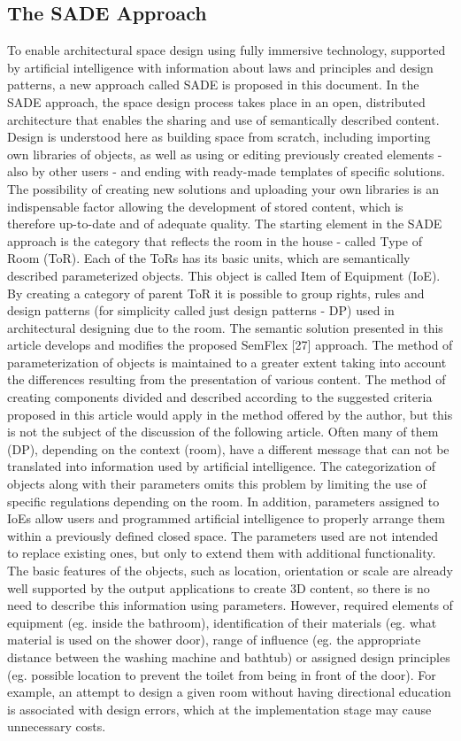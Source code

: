 \documentclass[runningheads]{llncs}
\begin{document}
\subsection{The SADE Approach}
To enable architectural space design using fully immersive technology, supported by artificial intelligence with information about laws and principles and design patterns, a new approach called SADE is proposed in this document.
In the SADE approach, the space design process takes place in an open, distributed architecture that enables the sharing and use of semantically described content. Design is understood here as building space from scratch, including importing own libraries of objects, as well as using or editing previously created elements - also by other users - and ending with ready-made templates of specific solutions. The possibility of creating new solutions and uploading your own libraries is an indispensable factor allowing the development of stored content, which is therefore up-to-date and of adequate quality.
The starting element in the SADE approach is the category that reflects the room in the house - called Type of Room (ToR). Each of the ToRs has its basic units, which are semantically described parameterized objects. This object is called Item of Equipment (IoE).
By creating a category of parent ToR it is possible to group rights, rules and design patterns (for simplicity called just design patterns - DP) used in architectural designing due to the room. The semantic solution presented in this article develops and modifies the proposed SemFlex [27] approach. The method of parameterization of objects is maintained to a greater extent taking into account the differences resulting from the presentation of various content. The method of creating components divided and described according to the suggested criteria proposed in this article would apply in the method offered by the author, but this is not the subject of the discussion of the following article. Often many of them (DP), depending on the context (room), have a different message that can not be translated into information used by artificial intelligence. The categorization of objects along with their parameters omits this problem by limiting the use of specific regulations depending on the room. In addition, parameters assigned to IoEs allow users and programmed artificial intelligence to properly arrange them within a previously defined closed space.
The parameters used are not intended to replace existing ones, but only to extend them with additional functionality. The basic features of the objects, such as location, orientation or scale are already well supported by the output applications to create 3D content, so there is no need to describe this information using parameters. However, required elements of equipment (eg. inside the bathroom), identification of their materials (eg. what material is used on the shower door), range of influence (eg. the appropriate distance between the washing machine and bathtub) or assigned design principles (eg. possible location to prevent the toilet from being in front of the door). For example, an attempt to design a given room without having directional education is associated with design errors, which at the implementation stage may cause unnecessary costs. 
\end{document}
